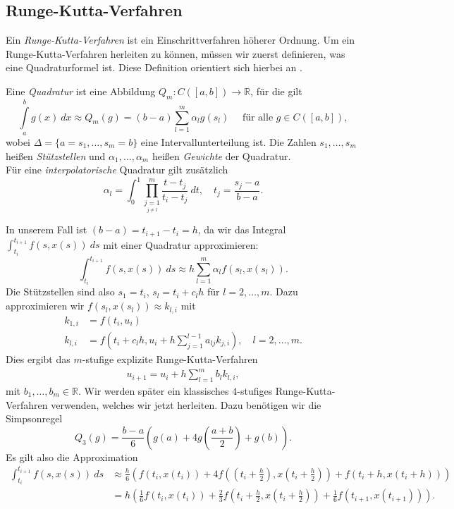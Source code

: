\subsection{Runge-Kutta-Verfahren}
Ein \textit{Runge-Kutta-Verfahren} ist ein Einschrittverfahren höherer Ordnung. Um ein Runge-Kutta-Verfahren herleiten
zu können, müssen wir zuerst definieren, was eine Quadraturformel ist. Diese Definition orientiert sich hierbei an
\cite[Kapitel 9]{p.deuflharda.hohmannNumerischeMathematik2018}.
\begin{definition}
    Eine {\em Quadratur} ist eine Abbildung $Q_m: C([a,b])\rightarrow \mathbb{R}$, für die gilt
    \[
        \int\limits_a^b g(x)\ dx \approx Q_m(g) = (b-a)\sum_{l=1}^{m}\alpha_l g(s_l) \quad \text{ für alle } g \in C([a,b]),
    \]
    wobei $\Delta = \{a=s_1, \dots, s_m=b\}$ eine Intervallunterteilung ist. Die Zahlen $s_1, \dots, s_m$ heißen {\em Stützstellen}
    und $\alpha_1, \dots, \alpha_m$ heißen {\em Gewichte} der Quadratur.\\
    Für eine {\em interpolatorische} Quadratur gilt zusätzlich
    \[
        \alpha_l = \int_{0}^{1} \prod_{\underset{j\neq l}{j=1}}^{m} \frac{t-t_j}{t_i-t_j}\ dt,
        \quad t_j = \frac{s_j-a}{b-a}.
    \]
\end{definition}
In unserem Fall ist $(b-a)=t_{i+1}-t_i=h$, da wir das Integral $\int_{t_i}^{t_{i+1}} f(s,x(s))\ ds$ mit einer Quadratur
approximieren:
\[
    \int_{t_i}^{t_{i+1}} f(s,x(s))\ ds \approx h \sum_{l=1}^{m}\alpha_l f(s_l,x(s_l)).
\]
Die Stützstellen sind also $s_1=t_i$, $s_l=t_i+c_{l} h$ für $l = 2,\dots, m$. Dazu approximieren wir
$f(s_l,x(s_l))\approx k_{l,i}$ mit
\begin{align}
    \label{eq:rk}
    k_{1,i} &= f(t_i,u_i) \nonumber \\
    k_{l,i} &= f(t_i+c_lh, u_i + h\sum_{j=1}^{l-1}a_{lj}k_{j,i} ), \quad l=2,\dots,m.
\end{align}
Dies ergibt das $m$-stufige explizite Runge-Kutta-Verfahren
\begin{align}
    u_{i+1} = u_i + h \sum_{l=1}^{m} b_l k_{l,i},   \label{exp-rk-def}
\end{align}
mit $b_1, \dots, b_m \in \mathbb{R}$.
Wir werden später ein klassisches $4$-stufiges Runge-Kutta-Verfahren verwenden, welches wir jetzt herleiten.
Dazu benötigen wir die Simpsonregel
\[
    Q_3(g) = \frac{b-a}{6} \left(g(a) + 4g\left(\frac{a+b}{2}\right) +g(b)\right).
\]
Es gilt also die Approximation
\begin{align*}
    \int_{t_i}^{t_{i+1}} f(s,x(s)) \ ds &\approx
    \frac{h}{6}\left(f(t_i,x(t_i)) + 4f\left(\left(t_i + \frac{h}{2}\right), x\left(t_i+\frac{h}{2}\right)\right) + f(t_i + h,x(t_i + h))\right) \\
    &= h\left(\frac{1}{6}f(t_i,x(t_i)) + \frac{2}{3}f\left( t_i + \frac{h}{2}, x\left( t_i + \frac{h}{2}\right) \right)
    + \frac{1}{6}f(t_{i+1},x(t_{i+1}))\right). \\
\end{align*}
